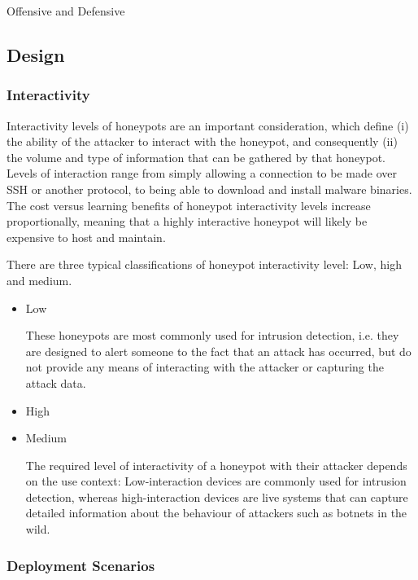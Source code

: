 \bullet Offensive and Defensive


\subsection{Design}

\subsubsection{Interactivity}

Interactivity levels of honeypots are an important consideration, which define (i) the ability of the attacker to interact with the honeypot, and consequently (ii) the volume and type of information that can be gathered by that honeypot. Levels of interaction range from simply allowing a connection to be made over SSH or another protocol, to being able to download and install malware binaries. The cost versus learning benefits of honeypot interactivity levels increase proportionally, meaning that a highly interactive honeypot will likely be expensive to host and maintain. 

There are three typical classifications of honeypot interactivity level: Low, high and medium.

\begin{itemize}
\item Low

These honeypots are most commonly used for intrusion detection, i.e. they are designed to
alert someone to the fact that an attack has occurred, but do not provide any means of
interacting with the attacker or capturing the attack data.
\item High

\item Medium

The required level of interactivity of a honeypot with their attacker depends on the use context:
Low-interaction devices are commonly used for intrusion detection, whereas high-interaction
devices are live systems that can capture detailed information about the behaviour of attackers such as botnets in the wild.
\end{itemize}

\subsubsection{Deployment Scenarios}


